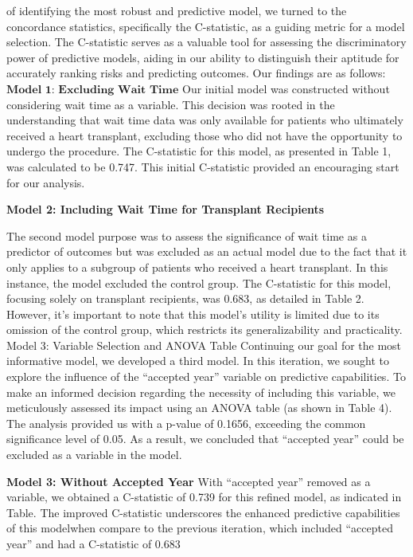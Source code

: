 \documentclass[
  letterpaper,
  DIV=11,
  numbers=noendperiod]{scrreprt}
\begin{document}
of identifying the most robust and predictive model, we turned to the
concordance statistics, specifically the C-statistic, as a guiding
metric for a model selection. The C-statistic serves as a valuable tool
for assessing the discriminatory power of predictive models, aiding in
our ability to distinguish their aptitude for accurately ranking risks
and predicting outcomes. Our findings are as follows:
\(\textbf{Model 1: Excluding Wait Time}\) Our initial model was
constructed without considering wait time as a variable. This decision
was rooted in the understanding that wait time data was only available
for patients who ultimately received a heart transplant, excluding those
who did not have the opportunity to undergo the procedure. The
C-statistic for this model, as presented in Table 1, was calculated to
be 0.747. This initial C-statistic provided an encouraging start for our
analysis.

\textbf{Model 2: Including Wait Time for Transplant Recipients}

The second model purpose was to assess the significance of wait time as
a predictor of outcomes but was excluded as an actual model due to the
fact that it only applies to a subgroup of patients who received a heart
transplant. In this instance, the model excluded the control group. The
C-statistic for this model, focusing solely on transplant recipients,
was 0.683, as detailed in Table 2. However, it's important to note that
this model's utility is limited due to its omission of the control
group, which restricts its generalizability and practicality. Model 3:
Variable Selection and ANOVA Table Continuing our goal for the most
informative model, we developed a third model. In this iteration, we
sought to explore the influence of the ``accepted year'' variable on
predictive capabilities. To make an informed decision regarding the
necessity of including this variable, we meticulously assessed its
impact using an ANOVA table (as shown in Table 4). The analysis provided
us with a p-value of 0.1656, exceeding the common significance level of
0.05. As a result, we concluded that ``accepted year'' could be excluded
as a variable in the model.

\textbf{Model 3: Without Accepted Year} With ``accepted year'' removed
as a variable, we obtained a C-statistic of 0.739 for this refined
model, as indicated in Table. The improved C-statistic underscores the
enhanced predictive capabilities of this modelwhen compare to the
previous iteration, which included ``accepted year'' and had a
C-statistic of 0.683
\end{document}
